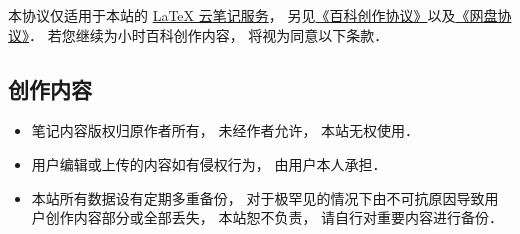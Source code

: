
本协议仅适用于本站的 \href{http://example.com}{LaTeX 云笔记服务}， 另见\href{http://www.example.com}{《百科创作协议》}以及\href{http://www.example.com}{《网盘协议》}． 若您继续为小时百科创作内容， 将视为同意以下条款．

\subsection{创作内容}
\begin{itemize}
\item 笔记内容版权归原作者所有， 未经作者允许， 本站无权使用．
\item 用户编辑或上传的内容如有侵权行为， 由用户本人承担．
\item 本站所有数据设有定期多重备份， 对于极罕见的情况下由不可抗原因导致用户创作内容部分或全部丢失， 本站恕不负责， 请自行对重要内容进行备份．
\end{itemize}
